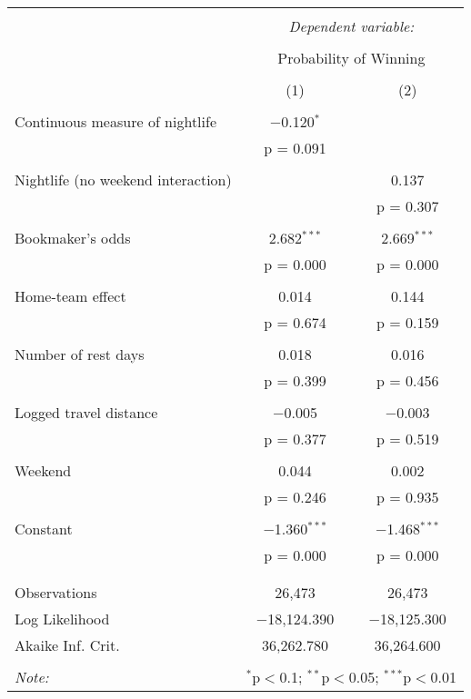 \documentclass[letterpaper,12pt]{article}
\begin{document}
\begin{tabular}{@{\extracolsep{5pt}}lcc}  \\[-1.8ex]\hline  \hline \\[-1.8ex]   & \multicolumn{2}{c}{\textit{Dependent variable:}} \\  \cline{2-3}  \\[-1.8ex] & \multicolumn{2}{c}{Probability of Winning} \\  \\[-1.8ex] & (1) & (2)\\  \hline \\[-1.8ex]   Continuous measure of nightlife & $-$0.120$^{*}$ &  \\    & p = 0.091 &  \\    & & \\   Nightlife (no weekend interaction) &  & 0.137 \\    &  & p = 0.307 \\    & & \\   Bookmaker's odds & 2.682$^{***}$ & 2.669$^{***}$ \\    & p = 0.000 & p = 0.000 \\    & & \\   Home-team effect & 0.014 & 0.144 \\    & p = 0.674 & p = 0.159 \\    & & \\   Number of rest days & 0.018 & 0.016 \\    & p = 0.399 & p = 0.456 \\    & & \\   Logged travel distance & $-$0.005 & $-$0.003 \\    & p = 0.377 & p = 0.519 \\    & & \\   Weekend & 0.044 & 0.002 \\    & p = 0.246 & p = 0.935 \\    & & \\   Constant & $-$1.360$^{***}$ & $-$1.468$^{***}$ \\    & p = 0.000 & p = 0.000 \\    & & \\  \hline \\[-1.8ex]  Observations & 26,473 & 26,473 \\  Log Likelihood & $-$18,124.390 & $-$18,125.300 \\  Akaike Inf. Crit. & 36,262.780 & 36,264.600 \\  \hline  \hline \\[-1.8ex]  \textit{Note:}  & \multicolumn{2}{r}{$^{*}$p$<$0.1; $^{**}$p$<$0.05; $^{***}$p$<$0.01} \\  \end{tabular}  
\end{document}
